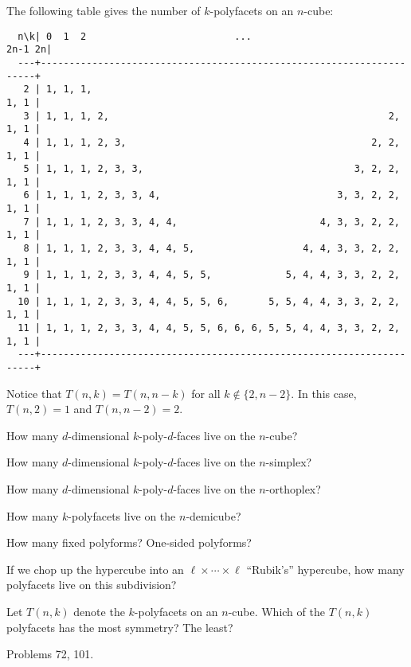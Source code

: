 \documentclass{article}
\begin{document}
\begin{note}
  The following table gives the number of $k$-polyfacets on an $n$-cube:
  \begin{verbatim}
  n\k| 0  1  2                          ...                         2n-1 2n|
  ---+---------------------------------------------------------------------+
   2 | 1, 1, 1,                                                       1, 1 |
   3 | 1, 1, 1, 2,                                                 2, 1, 1 |
   4 | 1, 1, 1, 2, 3,                                           2, 2, 1, 1 |
   5 | 1, 1, 1, 2, 3, 3,                                     3, 2, 2, 1, 1 |
   6 | 1, 1, 1, 2, 3, 3, 4,                               3, 3, 2, 2, 1, 1 |
   7 | 1, 1, 1, 2, 3, 3, 4, 4,                         4, 3, 3, 2, 2, 1, 1 |
   8 | 1, 1, 1, 2, 3, 3, 4, 4, 5,                   4, 4, 3, 3, 2, 2, 1, 1 |
   9 | 1, 1, 1, 2, 3, 3, 4, 4, 5, 5,             5, 4, 4, 3, 3, 2, 2, 1, 1 |
  10 | 1, 1, 1, 2, 3, 3, 4, 4, 5, 5, 6,       5, 5, 4, 4, 3, 3, 2, 2, 1, 1 |
  11 | 1, 1, 1, 2, 3, 3, 4, 4, 5, 5, 6, 6, 6, 5, 5, 4, 4, 3, 3, 2, 2, 1, 1 |
  ---+---------------------------------------------------------------------+
  \end{verbatim}
  Notice that $T(n,k) = T(n,n-k)$ for all $k \not\in \{2, n-2\}$. In this case,
  $T(n,2) = 1$ and $T(n,n-2) = 2$.
\end{note}

\begin{related}
  \item How many $d$-dimensional $k$-poly-$d$-faces live on the $n$-cube?
  \item How many $d$-dimensional $k$-poly-$d$-faces live on the $n$-simplex?
  \item How many $d$-dimensional $k$-poly-$d$-faces live on the $n$-orthoplex?
  \item How many $k$-polyfacets live on the $n$-demicube?
  \item How many fixed polyforms? One-sided polyforms?
  \item If we chop up the hypercube into an $\ell \times \cdots \times \ell$ ``Rubik's'' hypercube, how many polyfacets live on this subdivision?
  \item Let $T(n,k)$ denote the $k$-polyfacets on an $n$-cube.
    Which of the $T(n,k)$ polyfacets has the most symmetry? The least?
\end{related}
\begin{references}
  \item Problems 72, 101.
\end{references}
\end{document}
